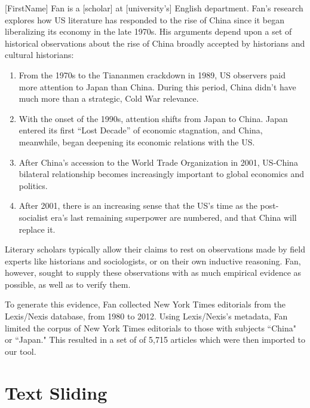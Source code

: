 \documentclass{sig-alternate}
\begin{document}
[FirstName] Fan is a [scholar] at [university's] English department. Fan's research explores how US literature has responded to the rise of China since it began liberalizing its economy in the late 1970s.  His arguments depend upon a set of historical observations about the rise of China  broadly accepted by historians and cultural historians: 
\begin{enumerate}
\item From the 1970s to the Tiananmen crackdown in 1989, US observers paid more attention to Japan than China. During this period, China didn't have much more than a strategic, Cold War relevance. 
\item With the onset of the 1990s, attention shifts from Japan to China. Japan entered its first ``Lost Decade'' of economic stagnation, and China, meanwhile, began deepening its economic relations with the US.
\item After China's accession to the World Trade Organization in 2001, US-China bilateral relationship becomes increasingly important to global economics and politics.
\item After 2001, there is an increasing sense that the US's time as the post-socialist era's last remaining superpower are numbered, and that China will replace it.
\end{enumerate}
Literary scholars typically allow their claims to rest on observations made by field experts like historians and sociologists, or on their own inductive reasoning. Fan, however, sought to supply these observations with as much empirical evidence as possible, as well as to verify them.

To generate this evidence, Fan collected New York Times editorials from  the Lexis/Nexis database, from 1980 to 2012. Using Lexis/Nexis's metadata, Fan limited the corpus of New York Times editorials to those with subjects ``China" or ``Japan." This resulted in a set of of 5,715 articles which were then imported to our tool.


\section{Text Sliding}
\end{document}
